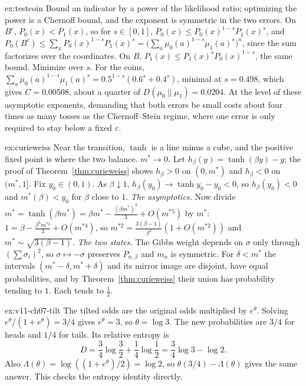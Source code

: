 \begin{solution}{ex:testcoin}
\idea Bound an indicator by a power of the likelihood ratio; optimizing the power is a Chernoff bound, and the exponent is symmetric in the two errors.
\writeup On $B^c$, $P_0(x)<P_1(x)$, so for $s\in[0,1]$, $P_0(x)\le P_0(x)^{1-s}P_1(x)^s$, and $P_0(B^c)\le\sum_xP_0(x)^{1-s}P_1(x)^s=\bigl(\sum_a\mu_0(a)^{1-s}\mu_1(a)^s\bigr)^n$, since the sum
factorizes over the coordinates. On $B$, $P_1(x)\le P_1(x)^sP_0(x)^{1-s}$, the same bound. Minimize over $s$. For the coins, $\sum_a\mu_0(a)^{1-s}\mu_1(a)^s=0.5^{1-s}(0.6^s+0.4^s)$, minimal at $s=0.498$, which gives $C=0.00508$, about a quarter of $D(\mu_0\|\mu_1)=0.0204$.
At the level of these asymptotic exponents, demanding that both errors be small costs about four times as many tosses as the Chernoff--Stein regime, where one error is only required to stay below a fixed $\varepsilon$.
\end{solution}

\begin{solution}{ex:curieweiss}
\idea Near the transition, $\tanh$ is a line minus a cube, and the positive fixed point is where the two balance.
\writeup \emph{$m^*\to0$.} Let $h_\beta(y)=\tanh(\beta y)-y$; the proof of Theorem~\ref{thm:curieweiss} shows $h_\beta>0$ on $(0,m^*)$ and $h_\beta<0$ on $(m^*,1]$. Fix
$y_0\in(0,1)$. As $\beta\downarrow1$, $h_\beta(y_0)\to\tanh y_0-y_0<0$, so $h_\beta(y_0)<0$ and $m^*(\beta)<y_0$ for $\beta$ close to $1$.
\emph{The asymptotics.} Now divide $m^*=\tanh(\beta m^*)=\beta m^*-\frac{(\beta m^*)^3}3+O(m^{*5})$ by $m^*$: $1=\beta-\frac{\beta^3m^{*2}}3+O(m^{*4})$, so
$m^{*2}=\frac{3(\beta-1)}{\beta^3}(1+O(m^{*2}))$ and $m^*\sim\sqrt{3(\beta-1)}$.
\emph{The two states.} The Gibbs weight depends on $\sigma$ only through $(\sum\sigma_i)^2$, so $\sigma\mapsto-\sigma$ preserves $P_{n,\beta}$ and $m_n$ is symmetric. For $\delta<m^*$ the intervals
$(m^*-\delta,m^*+\delta)$ and its mirror image are disjoint, have equal probabilities, and by Theorem~\ref{thm:curieweiss} their union has probability tending to $1$. Each tends to $\frac12$.
\end{solution}

\begin{solution}{ex:v11-ch07-tilt}
\idea The tilted odds are the original odds multiplied by $e^\theta$.
\writeup Solving $e^\theta/(1+e^\theta)=3/4$ gives $e^\theta=3$, so $\theta=\log3$. The new probabilities are $3/4$ for heads and $1/4$ for tails. Its relative entropy is
\[
D=\frac34\log\frac32+\frac14\log\frac12=\frac34\log3-\log2.
\]
Also $\Lambda(\theta)=\log((1+e^\theta)/2)=\log2$, so $\theta(3/4)-\Lambda(\theta)$ gives the same answer. This checks the entropy identity directly.
\end{solution}

